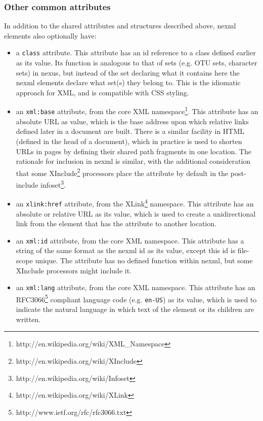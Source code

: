 \documentclass{article}
\newcommand{\code}{\texttt} \usepackage{fullpage}
\begin{document}
\subsubsection{Other common attributes} In addition to the shared
attributes and structures described above, nexml elements also
optionally have:

\begin{itemize}

\item a \code{class} attribute. This attribute has an id reference to a
class defined earlier as its value. Its function is analogous to that of
sets (e.g. OTU sets, character sets) in nexus, but instead of the set
declaring what it contains here the nexml elements declare what set(s)
they belong to. This is the idiomatic approach for XML, and is
compatible with CSS styling.

\item an \code{xml:base} attribute, from the core XML
namespace\footnote{http://en.wikipedia.org/wiki/XML\_Namespace}. This
attribute has an absolute URL as value, which is the base address upon
which relative links defined later in a document are built. There is a
similar facility in HTML (defined in the head of a document), which in
practice is used to shorten URLs in pages by defining their shared path
fragments in one location. The rationale for inclusion in nexml is
similar, with the additional consideration that some
XInclude\footnote{http://en.wikipedia.org/wiki/XInclude} processors
place the attribute by default in the post-include
infoset\footnote{http://en.wikipedia.org/wiki/Infoset}.

\item an \code{xlink:href} attribute, from the
XLink\footnote{http://en.wikipedia.org/wiki/XLink} namespace. This
attribute has an absolute or relative URL as its value, which is used to
create a unidirectional link from the element that has the attribute to
another location.

\item an \code{xml:id} attribute, from the core XML namespace. This
attribute has a string of the same format as the nexml id as its value,
except this id is file-scope unique. The attribute has no defined
function within nexml, but some XInclude processors might include it.

\item an \code{xml:lang} attribute, from the core XML namespace. This
attribute has an RFC3066\footnote{http://www.ietf.org/rfc/rfc3066.txt}
compliant language code (e.g. \code{en-US}) as its value, which is used
to indicate the natural language in which text of the element or its
children are written.

\end{itemize}
\end{document}

